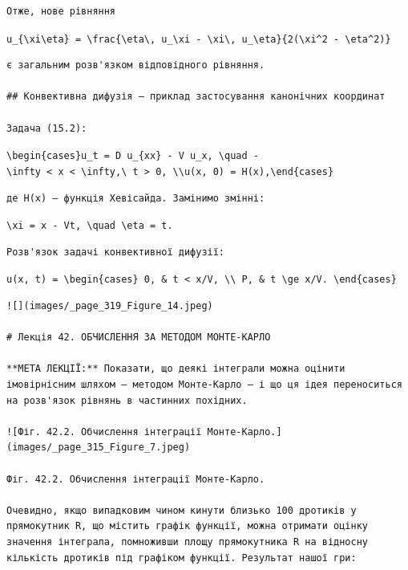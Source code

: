 \documentclass[
  ukrainian,
]{article}
\begin{document}
\begin{verbatim}
Отже, нове рівняння
\end{verbatim}

\texttt{u\_\{\textbackslash{}xi\textbackslash{}eta\}\ =\ \textbackslash{}frac\{\textbackslash{}eta\textbackslash{},\ u\_\textbackslash{}xi\ -\ \textbackslash{}xi\textbackslash{},\ u\_\textbackslash{}eta\}\{2(\textbackslash{}xi\^{}2\ -\ \textbackslash{}eta\^{}2)\}}

\begin{verbatim}
є загальним розв'язком відповідного рівняння.

## Конвективна дифузія — приклад застосування канонічних координат

Задача (15.2):
\end{verbatim}

\texttt{\textbackslash{}begin\{cases\}u\_t\ =\ D\ u\_\{xx\}\ -\ V\ u\_x,\ \textbackslash{}quad\ -\textbackslash{}infty\ \textless{}\ x\ \textless{}\ \textbackslash{}infty,\textbackslash{}\ t\ \textgreater{}\ 0,\ \textbackslash{}\textbackslash{}u(x,\ 0)\ =\ H(x),\textbackslash{}end\{cases\}}

\begin{verbatim}
де H(x) — функція Хевісайда. Замінимо змінні:
\end{verbatim}

\texttt{\textbackslash{}xi\ =\ x\ -\ Vt,\ \textbackslash{}quad\ \textbackslash{}eta\ =\ t.}

\begin{verbatim}
Розв'язок задачі конвективної дифузії:
\end{verbatim}

\texttt{u(x,\ t)\ =\ \textbackslash{}begin\{cases\}\ 0,\ \&\ t\ \textless{}\ x/V,\ \textbackslash{}\textbackslash{}\ P,\ \&\ t\ \textbackslash{}ge\ x/V.\ \textbackslash{}end\{cases\}}

\begin{verbatim}
![](images/_page_319_Figure_14.jpeg)

# Лекція 42. ОБЧИСЛЕННЯ ЗА МЕТОДОМ МОНТЕ-КАРЛО

**МЕТА ЛЕКЦІЇ:** Показати, що деякі інтеграли можна оцінити імовірнісним шляхом — методом Монте-Карло — і що ця ідея переноситься на розв'язок рівнянь в частинних похідних.

![Фіг. 42.2. Обчислення інтеграції Монте-Карло.](images/_page_315_Figure_7.jpeg)

Фіг. 42.2. Обчислення інтеграції Монте-Карло.

Очевидно, якщо випадковим чином кинути близько 100 дротиків у прямокутник R, що містить графік функції, можна отримати оцінку значення інтеграла, помноживши площу прямокутника R на відносну кількість дротиків під графіком функції. Результат нашої гри:
\end{verbatim}
\end{document}
